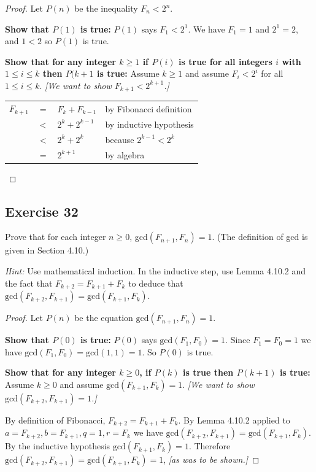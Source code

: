 \documentclass[14pt]{extarticle}
\newcommand{\cy}{\color{cyan}}
\begin{document}
\begin{proof}
Let $P(n)$ be the inequality $F_n < 2^n$.

{\bf Show that $P(1)$ is true:} 
$P(1)$ says $F_1 < 2^1$. We have $F_1 = 1$ and $2^1 = 2$, and $1 < 2$ so $P(1)$ is true.

{\bf Show that for any integer $k \geq 1$ if $P(i)$ is true for all integers $i$ with $1 \leq i \leq k$ then $P(k+1$ 
is true:}
Assume $k \geq 1$ and assume $F_i < 2^i$ for all $1 \leq i \leq k$. {\it [We want to show $F_{k+1} < 2^{k+1}$.]}

\begin{center}
\begin{tabular}{rcll}
\(F_{k+1}\) & = & \(F_k + F_{k - 1}\) & {\cy by Fibonacci definition} \\
& $<$ & \(2^k + 2^{k - 1}\) & {\cy by inductive hypothesis} \\
& $<$ & \(2^k + 2^k\) & {\cy because \(2^{k-1} < 2^k\)} \\
& $=$ & \(2^{k+1}\) & {\cy by algebra}
\end{tabular}
\end{center}
\end{proof}

\subsection{Exercise 32}
Prove that for each integer $n \geq 0$, gcd$(F_{n + 1}, F_n) = 1$. 
(The definition of gcd is given in Section 4.10.)

{\it Hint:} Use mathematical induction. In the inductive step, use Lemma 4.10.2 and the fact that 
\(F_{k+2} = F_{k+1} + F_k\) to deduce that \(\text{gcd}(F_{k+2}, F_{k+1}) = \text{gcd}(F_{k+1}, F_k)\).

\begin{proof}
Let \(P(n)\) be the equation \(\text{gcd}(F_{n + 1}, F_n) = 1\).

{\bf Show that \(P(0)\) is true:} \(P(0)\) says \(\text{gcd}(F_1, F_0) = 1\). Since \(F_1 = F_0 = 1\) we 
have \(\text{gcd}(F_1, F_0) = \text{gcd}(1, 1) = 1\). So \(P(0)\) is true.

{\bf Show that for any integer $k \geq 0$, if \(P(k)\) is true then \(P(k+1)\) is true:}
Assume \(k \geq 0\) and assume \(\text{gcd}(F_{k+1}, F_k) = 1\).
{\it [We want to show \(\text{gcd}(F_{k+2}, F_{k+1}) = 1\).]}

By definition of Fibonacci, \(F_{k+2} = F_{k+1} + F_k\).
By Lemma 4.10.2 applied to \(a = F_{k+2}, b = F_{k+1}, q = 1, r = F_k\) we have 
\(\text{gcd}(F_{k+2}, F_{k+1}) = \text{gcd}(F_{k+1}, F_k)\).
By the inductive hypothesis \(\text{gcd}(F_{k+1}, F_k) = 1\). 
Therefore \(\text{gcd}(F_{k+2}, F_{k+1}) = \text{gcd}(F_{k+1}, F_k) = 1\), {\it [as was to be shown.]}
\end{proof}
\end{document}
